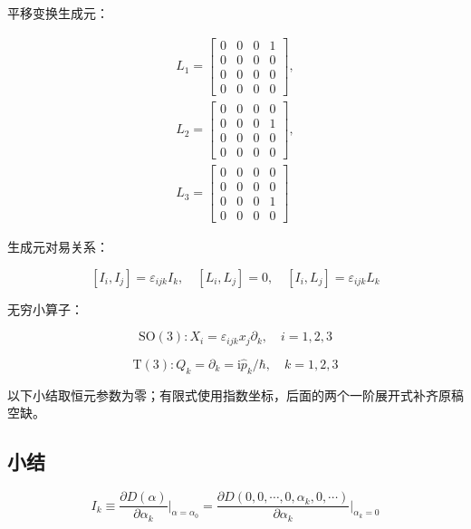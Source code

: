 平移变换生成元：

\begin{gather}
L_1
=\begin{bmatrix}
0 &0 &0 &1 \\
0 &0 &0 &0 \\
0 &0 &0 &0 \\
0 &0 &0 &0
\end{bmatrix},\\
L_2
=\begin{bmatrix}
0 &0 &0 &0 \\
0 &0 &0 &1 \\
0 &0 &0 &0 \\
0 &0 &0 &0
\end{bmatrix},\\
L_3
=\begin{bmatrix}
0 &0 &0 &0 \\
0 &0 &0 &0 \\
0 &0 &0 &1 \\
0 &0 &0 &0
\end{bmatrix}
\end{gather}

生成元对易关系：

\begin{equation}
\left[I_i , I_j \right] = \varepsilon_{ijk} I_k,\quad
\left[L_i , L_j \right] = 0,\quad
\left[I_i , L_j \right] = \varepsilon_{ijk} L_k
\end{equation}

无穷小算子：

\begin{equation}
\mathrm{SO}\left(3\right):X_i=\varepsilon_{ijk} x_j\partial_k,\quad i=1,2,3
\end{equation}

\begin{equation}
\mathrm{T}\left(3\right):Q_k=\partial_k=\mathrm{i}\hat{p}_k/\hbar,\quad k=1,2,3
\end{equation}

以下小结取恒元参数为零；有限式使用指数坐标，后面的两个一阶展开式补齐原稿空缺。

\subsection{小结}

\begin{equation}
I_k
\equiv \frac{\partial D\left(\alpha\right) }{\partial\alpha_k } \bigg|_{\alpha=\alpha_0}
=\frac{\partial D\left(0,0,\cdots,0,\alpha_k,0,\cdots\right) }{\partial \alpha_k }\bigg|_{\alpha_k=0}
\end{equation}

